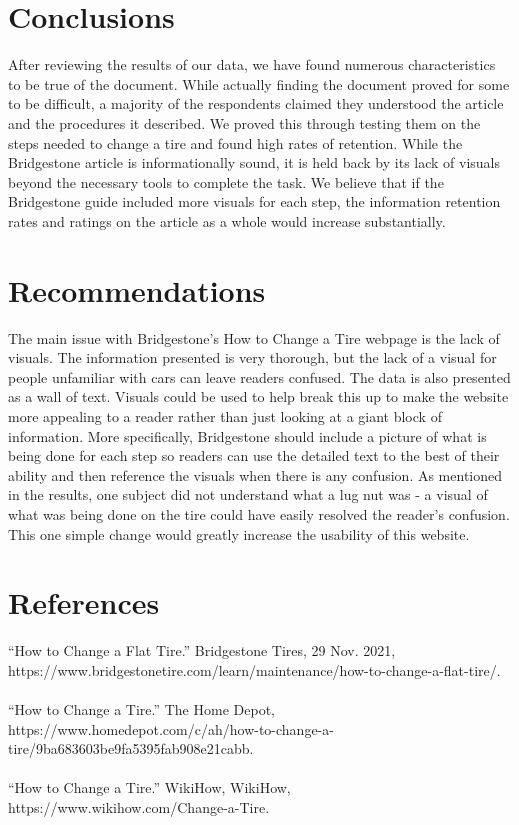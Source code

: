 \documentclass[12pt,A4paper]{article}
\begin{document}
	\section{Conclusions}
	After reviewing the results of our data, we have found numerous characteristics to be true of the document. While actually finding the document proved for some to be difficult, a majority of the respondents claimed they understood the article and the procedures it described. We proved this through testing them on the steps needed to change a tire and found high rates of retention. While the Bridgestone article is informationally sound, it is held back by its lack of visuals beyond the necessary tools to complete the task. We believe that if the Bridgestone guide included more visuals for each step, the information retention rates and ratings on the article as a whole would increase substantially.

	\section{Recommendations}
	The main issue with Bridgestone’s How to Change a Tire webpage is the lack of visuals. The information presented is very thorough, but the lack of a visual for people unfamiliar with cars can leave readers confused. The data is also presented as a wall of text. Visuals could be used to help break this up to make the website more appealing to a reader rather than just looking at a giant block of information. More specifically, Bridgestone should include a picture of what is being done for each step so readers can use the detailed text to the best of their ability and then reference the visuals when there is any confusion. As mentioned in the results, one subject did not understand what a lug nut was - a visual of what was being done on the tire could have easily resolved the reader's confusion. This one simple change would greatly increase the usability of this website.

	\section{References}
	\sloppy
	“How to Change a Flat Tire.” Bridgestone Tires, 29 Nov. 2021, https://www.bridgestonetire.com/learn/maintenance/how-to-change-a-flat-tire/.\\ \\
	“How to Change a Tire.” The Home Depot, https://www.homedepot.com/c/ah/how-to-change-a-tire/9ba683603be9fa5395fab908e21cabb.\\ \\
	“How to Change a Tire.” WikiHow, WikiHow, https://www.wikihow.com/Change-a-Tire.\\
	
	
\end{document}
